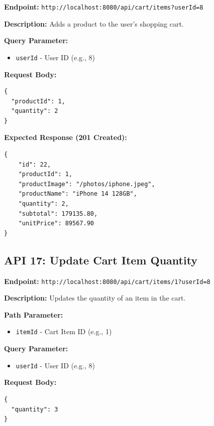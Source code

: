 \documentclass[12pt, a4paper]{article}
\begin{document}
\begin{tcolorbox}[colback=postcolor!10, colframe=postcolor, title=POST]
\textbf{Endpoint:} \texttt{http://localhost:8080/api/cart/items?userId=8}
\end{tcolorbox}

\textbf{Description:} Adds a product to the user's shopping cart.

\textbf{Query Parameter:}
\begin{itemize}
    \item \texttt{userId} - User ID (e.g., 8)
\end{itemize}

\textbf{Request Body:}
\begin{lstlisting}
{
  "productId": 1,
  "quantity": 2
}
\end{lstlisting}

\textbf{Expected Response (201 Created):}
\begin{lstlisting}
{
    "id": 22,
    "productId": 1,
    "productImage": "/photos/iphone.jpeg",
    "productName": "iPhone 14 128GB",
    "quantity": 2,
    "subtotal": 179135.80,
    "unitPrice": 89567.90
}
\end{lstlisting}

\vspace{0.5cm}

\subsection{API 17: Update Cart Item Quantity}

\begin{tcolorbox}[colback=putcolor!10, colframe=putcolor, title=PUT]
\textbf{Endpoint:} \texttt{http://localhost:8080/api/cart/items/1?userId=8}
\end{tcolorbox}

\textbf{Description:} Updates the quantity of an item in the cart.

\textbf{Path Parameter:}
\begin{itemize}
    \item \texttt{itemId} - Cart Item ID (e.g., 1)
\end{itemize}

\textbf{Query Parameter:}
\begin{itemize}
    \item \texttt{userId} - User ID (e.g., 8)
\end{itemize}

\textbf{Request Body:}
\begin{lstlisting}
{
  "quantity": 3
}
\end{lstlisting}
\end{document}
